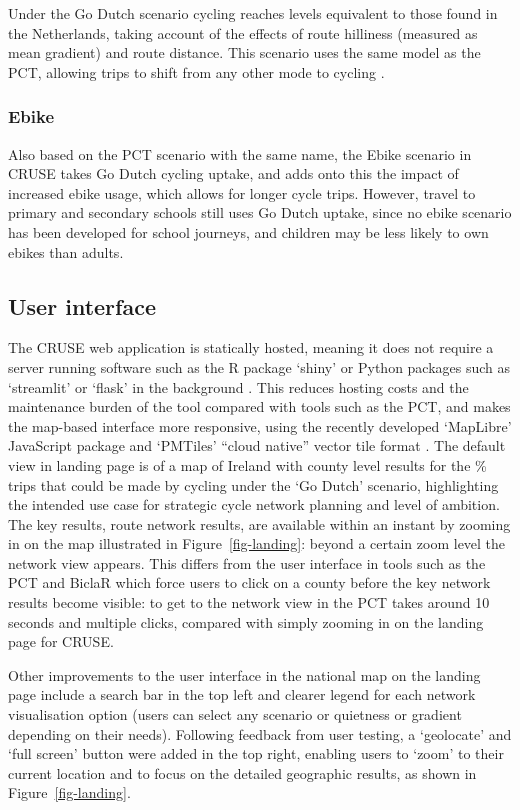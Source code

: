 \documentclass[
  super,
  preprint,
  3p]{elsarticle}
\begin{document}
Under the Go Dutch scenario cycling reaches levels equivalent to those
found in the Netherlands, taking account of the effects of route
hilliness (measured as mean gradient) and route distance. This scenario
uses the same model as the PCT, allowing trips to shift from any other
mode to cycling \citep{lovelace2017}.

\subsubsection{Ebike}\label{ebike}

Also based on the PCT scenario with the same name, the Ebike scenario in
CRUSE takes Go Dutch cycling uptake, and adds onto this the impact of
increased ebike usage, which allows for longer cycle trips. However,
travel to primary and secondary schools still uses Go Dutch uptake,
since no ebike scenario has been developed for school journeys, and
children may be less likely to own ebikes than adults.

\subsection{User interface}\label{sec-ui}

The CRUSE web application is statically hosted, meaning it does not
require a server running software such as the R package `shiny' or
Python packages such as `streamlit' or `flask' in the background
\citep{wickham2021}. This reduces hosting costs and the maintenance
burden of the tool compared with tools such as the PCT, and makes the
map-based interface more responsive, using the recently developed
`MapLibre' JavaScript package and `PMTiles' ``cloud native'' vector tile
format \citep{gonçalves2023}. The default view in landing page is of a
map of Ireland with county level results for the \% trips that could be
made by cycling under the `Go Dutch' scenario, highlighting the intended
use case for strategic cycle network planning and level of ambition. The
key results, route network results, are available within an instant by
zooming in on the map illustrated in Figure~\ref{fig-landing}: beyond a
certain zoom level the network view appears. This differs from the user
interface in tools such as the PCT and BiclaR which force users to click
on a county before the key network results become visible: to get to the
network view in the PCT takes around 10 seconds and multiple clicks,
compared with simply zooming in on the landing page for CRUSE.

Other improvements to the user interface in the national map on the
landing page include a search bar in the top left and clearer legend for
each network visualisation option (users can select any scenario or
quietness or gradient depending on their needs). Following feedback from
user testing, a `geolocate' and `full screen' button were added in the
top right, enabling users to `zoom' to their current location and to
focus on the detailed geographic results, as shown in
Figure~\ref{fig-landing}.
\end{document}
